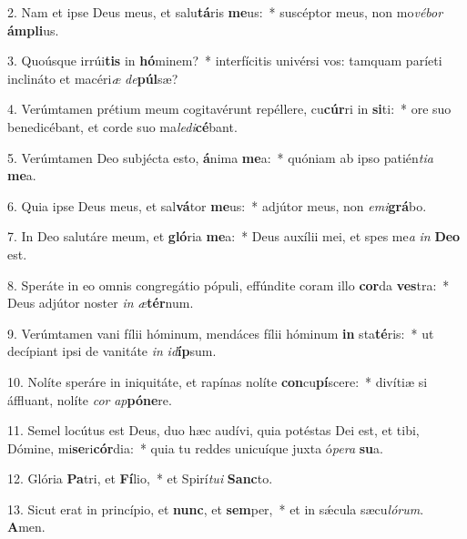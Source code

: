 2. Nam et ipse Deus meus, et salu\textbf{tá}ris \textbf{me}us:~*  suscéptor meus, non mo\textit{vé}\textit{bor} \textbf{ám}\textbf{pli}us.\

3. Quoúsque irrúi\textbf{tis} in \textbf{hó}minem?~*  interfícitis univérsi vos: tamquam paríeti inclináto et macéri\textit{æ} \textit{de}\textbf{púl}sæ?\

4. Verúmtamen prétium meum cogitavérunt repéllere, cu\textbf{cúr}ri in \textbf{si}ti:~*  ore suo benedicébant, et corde suo ma\textit{le}\textit{di}\textbf{cé}bant.\

5. Verúmtamen Deo subjécta esto, \textbf{á}nima \textbf{me}a:~*  quóniam ab ipso patién\textit{ti}\textit{a} \textbf{me}a.\

6. Quia ipse Deus meus, et sal\textbf{vá}tor \textbf{me}us:~*  adjútor meus, non \textit{e}\textit{mi}\textbf{grá}bo.\

7. In Deo salutáre meum, et \textbf{gló}ria \textbf{me}a:~*  Deus auxílii mei, et spes me\textit{a} \textit{in} \textbf{De}\textbf{o} est.\

8. Speráte in eo omnis congregátio pópuli, effúndite coram illo \textbf{cor}da \textbf{ves}tra:~*  Deus adjútor noster \textit{in} \textit{æ}\textbf{tér}num.\

9. Verúmtamen vani fílii hóminum, mendáces fílii hóminum \textbf{in} sta\textbf{té}ris:~*  ut decípiant ipsi de vanitáte \textit{in} \textit{id}\textbf{íp}sum.\

10. Nolíte speráre in iniquitáte, et rapínas nolíte \textbf{con}cu\textbf{pí}scere:~*  divítiæ si áffluant, nolíte \textit{cor} \textit{ap}\textbf{pó}\textbf{ne}re.\

11. Semel locútus est Deus, duo hæc audívi, quia potéstas Dei est, et tibi, Dómine, mi\textbf{se}ri\textbf{cór}dia:~*  quia tu reddes unicuíque juxta ó\textit{pe}\textit{ra} \textbf{su}a.\

12. Glória \textbf{Pa}tri, et \textbf{Fí}lio,~*  et Spirí\textit{tu}\textit{i} \textbf{Sanc}to.\

13. Sicut erat in princípio, et \textbf{nunc}, et \textbf{sem}per,~*  et in sǽcula sæcu\textit{ló}\textit{rum}. \textbf{A}men.\

